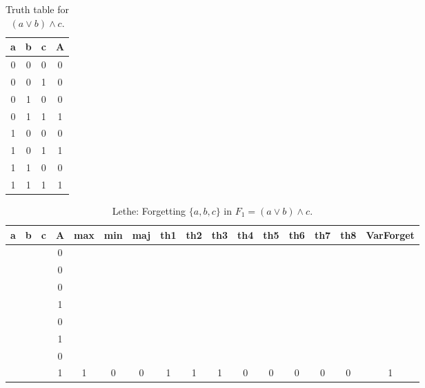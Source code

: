 \begin{table}[!tb]
    \centering
    \begin{tabular}{|c|c|c|c|}
        \hline
        \textbf{a} & \textbf{b} & \textbf{c} & \textbf{A} \\ \hline
        0 & 0 & 0 & 0 \\ \hline
        0 & 0 & 1 & 0 \\ \hline
        0 & 1 & 0 & 0 \\ \hline
        0 & 1 & 1 & 1 \\ \hline
        1 & 0 & 0 & 0 \\ \hline
        1 & 0 & 1 & 1 \\ \hline
        1 & 1 & 0 & 0 \\ \hline
        1 & 1 & 1 & 1 \\ \hline
    \end{tabular}
    \caption{Truth table for $(a \lor b) \land c$.}
    \label{tab:truthtab}
\end{table}

\begin{table}[!tb]
    \centering
    \begin{tabular}{|c|c|c|c|c|c|c|c|c|c|c|c|c|c|c|c|}
        \hline
        \textbf{a} & \textbf{b} & \textbf{c} & \textbf{A} & \textbf{max} & \textbf{min} & \textbf{maj} & \textbf{th1} & \textbf{th2} & \textbf{th3} & \textbf{th4} & \textbf{th5} & \textbf{th6} & \textbf{th7} & \textbf{th8} & \textbf{VarForget} \\ \hline
        \rowcolor{gray!40}  &  &  & 0 &  &  &  &  &  &  &  &  &  &  &  &  \\ \hline
        \rowcolor{gray!40}  &  &  & 0 &  &  &  &  &  &  &  &  &  &  &  &  \\ \hline
        \rowcolor{gray!40}  &  &  & 0 &  &  &  &  &  &  &  &  &  &  &  &  \\ \hline
        \rowcolor{gray!40}  &  &  & 1 &  &  &  &  &  &  &  &  &  &  &  &  \\ \hline
        \rowcolor{gray!40}  &  &  & 0 &  &  &  &  &  &  &  &  &  &  &  &  \\ \hline
        \rowcolor{gray!40}  &  &  & 1 &  &  &  &  &  &  &  &  &  &  &  &  \\ \hline
        \rowcolor{gray!40}  &  &  & 0 &  &  &  &  &  &  &  &  &  &  &  &  \\ \hline
        \rowcolor{gray!40}  &  &  & 1 & 1 & 0 & 0 & 1 & 1 & 1 & 0 & 0 & 0 & 0 & 0 & 1 \\ \hline
    \end{tabular}
    \caption{Lethe: Forgetting $\{a, b, c\}$ in $F_{1} = (a \lor b) \land c$.}
    \label{tab:lethe-F1-abc}
\end{table}
